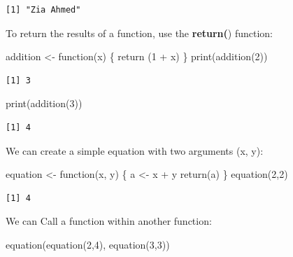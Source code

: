 \documentclass[
  letterpaper,
  DIV=11,
  numbers=noendperiod]{scrreprt}
\newenvironment{Shaded}{\begin{snugshade}}{\end{snugshade}}
\newcommand{\ControlFlowTok}[1]{\textcolor[rgb]{0.00,0.23,0.31}{#1}}
\newcommand{\DecValTok}[1]{\textcolor[rgb]{0.68,0.00,0.00}{#1}}
\newcommand{\FunctionTok}[1]{\textcolor[rgb]{0.28,0.35,0.67}{#1}}
\newcommand{\NormalTok}[1]{\textcolor[rgb]{0.00,0.23,0.31}{#1}}
\newcommand{\OtherTok}[1]{\textcolor[rgb]{0.00,0.23,0.31}{#1}}
\newcommand{\SpecialCharTok}[1]{\textcolor[rgb]{0.37,0.37,0.37}{#1}}
\begin{document}
\begin{verbatim}
[1] "Zia Ahmed"
\end{verbatim}

To return the results of a function, use the \textbf{return(}) function:

\begin{Shaded}
\begin{Highlighting}[]
\NormalTok{addition }\OtherTok{\textless{}{-}} \ControlFlowTok{function}\NormalTok{(x) \{}
  \FunctionTok{return}\NormalTok{ (}\DecValTok{1} \SpecialCharTok{+}\NormalTok{ x)}
\NormalTok{\}}
\FunctionTok{print}\NormalTok{(}\FunctionTok{addition}\NormalTok{(}\DecValTok{2}\NormalTok{))}
\end{Highlighting}
\end{Shaded}

\begin{verbatim}
[1] 3
\end{verbatim}

\begin{Shaded}
\begin{Highlighting}[]
\FunctionTok{print}\NormalTok{(}\FunctionTok{addition}\NormalTok{(}\DecValTok{3}\NormalTok{))}
\end{Highlighting}
\end{Shaded}

\begin{verbatim}
[1] 4
\end{verbatim}

We can create a simple equation with two arguments (x, y):

\begin{Shaded}
\begin{Highlighting}[]
\NormalTok{equation }\OtherTok{\textless{}{-}} \ControlFlowTok{function}\NormalTok{(x, y) \{}
\NormalTok{  a }\OtherTok{\textless{}{-}}\NormalTok{ x }\SpecialCharTok{+}\NormalTok{ y}
  \FunctionTok{return}\NormalTok{(a)}
\NormalTok{\}}
\FunctionTok{equation}\NormalTok{(}\DecValTok{2}\NormalTok{,}\DecValTok{2}\NormalTok{)}
\end{Highlighting}
\end{Shaded}

\begin{verbatim}
[1] 4
\end{verbatim}

We can Call a function within another function:

\begin{Shaded}
\begin{Highlighting}[]
\FunctionTok{equation}\NormalTok{(}\FunctionTok{equation}\NormalTok{(}\DecValTok{2}\NormalTok{,}\DecValTok{4}\NormalTok{), }\FunctionTok{equation}\NormalTok{(}\DecValTok{3}\NormalTok{,}\DecValTok{3}\NormalTok{))}
\end{Highlighting}
\end{Shaded}
\end{document}
